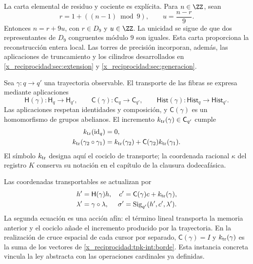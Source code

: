 La carta elemental de residuo y cociente es explícita. Para
\(n\in\ZZ\), sean
\[
 r=1+((n-1)\bmod9),\qquad u=\frac{n-r}{9}.
\]
Entonces \(n=r+9u\), con \(r\in D_9\) y \(u\in\ZZ\).
La unicidad se sigue de que dos representantes de \(D_9\) congruentes
módulo \(9\) son iguales. Esta carta proporciona la reconstrucción
entera local. Las torres de precisión incorporan, además, las aplicaciones
de truncamiento y los cilindros desarrollados en
\ref{x_reciprocidad:sec:extension} y \ref{x_reciprocidad:sec:generacion}.

Sea \(\gamma:q\to q'\) una trayectoria observable. El transporte
de las fibras se expresa mediante aplicaciones
\[
 \mathsf H(\gamma):\mathsf H_q\to\mathsf H_{q'},\qquad
 \mathsf C(\gamma):\mathsf C_q\to\mathsf C_{q'},\qquad
 \mathsf{Hist}(\gamma):\mathsf{Hist}_q\to\mathsf{Hist}_{q'}.
\]
Las aplicaciones respetan identidades y composición, y
\(\mathsf C(\gamma)\) es un homomorfismo de grupos abelianos.
El incremento \(k_{\rm tr}(\gamma)\in\mathsf C_{q'}\) cumple
\begin{equation}
 \begin{split}
 k_{\rm tr}(\operatorname{id}_q)&=0,\\
 k_{\rm tr}(\gamma_2\circ\gamma_1)
 &=k_{\rm tr}(\gamma_2)+
   \mathsf C(\gamma_2)k_{\rm tr}(\gamma_1).
 \end{split}
 \label{x_reciprocidad:tpk-int:cociclo}
\end{equation}
El símbolo \(k_{\rm tr}\) designa aquí el cociclo de transporte;
la coordenada racional \(\kappa\) del registro \(K\) conserva
su notación en el capítulo de la clausura dodecafásica.

Las coordenadas transportables se actualizan por
\begin{equation}
 \begin{aligned}
 h'&=\mathsf H(\gamma)h,&
 c'&=\mathsf C(\gamma)c+k_{\rm tr}(\gamma),\\
 \lambda'&=\gamma\circ\lambda,&
 \sigma'&=\operatorname{Sig}_{q'}(h',c',\lambda').
 \end{aligned}
 \label{x_reciprocidad:tpk-int:accion-memoria}
\end{equation}
La segunda ecuación es una acción afín: el término lineal transporta
la memoria anterior y el cociclo añade el incremento producido por la
trayectoria. En la realización de cruce espacial de cada cursor por separado,
\(\mathsf C(\gamma)=I\) y \(k_{\rm tr}(\gamma)\) es la suma
de los vectores de \eqref{x_reciprocidad:tpk-int:borde}. Esta instancia concreta
vincula la ley abstracta con las operaciones cardinales ya definidas.

